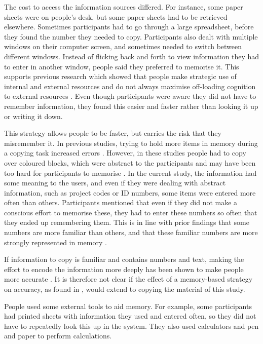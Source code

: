 The cost to access the information sources differed. For instance, some paper sheets were on people's desk, but some paper sheets had to be retrieved elsewhere. Sometimes participants had to go through a large spreadsheet, before they found the number they needed to copy. Participants also dealt with multiple windows on their computer screen, and sometimes needed to switch between different windows. Instead of flicking back and forth to view information they had to enter in another window, people said they preferred to memorise it. This supports previous research which showed that people make strategic use of internal and external resources and do not always maximise off-loading cognition to external resources \citep{Gray2006}. Even though participants were aware they did not have to remember information, they found this easier and faster rather than looking it up or writing it down. 

This strategy allows people to be faster, but carries the risk that they misremember it. In previous studies, trying to hold more items in memory during a copying task increased errors \citep[e.g.][]{Morgan2009}. However, in these studies people had to copy over coloured blocks, which were abstract to the participants and may have been too hard for participants to memorise \citep{Waldron2011}. In the current study, the information had some meaning to the users, and even if they were dealing with abstract information, such as project codes or ID numbers, some items were entered more often than others. Participants mentioned that even if they did not make a conscious effort to memorise these, they had to enter these numbers so often that they ended up remembering them. This is in line with prior findings that some numbers are more familiar than others, and that these familiar numbers are more strongly represented in memory \citep{Wiseman2014}. 

If information to copy is familiar and contains numbers and text, making the effort to encode the information more deeply has been shown to make people more accurate \citep{Gray2004, Soboczenski2013}. It is therefore not clear if the effect of a memory-based strategy on accuracy, as found in \citep{Morgan2009}, would extend to copying the material of this study.

People used some external tools to aid memory. For example, some participants had printed sheets with information they used and entered often, so they did not have to repeatedly look this up in the system. They also used calculators and pen and paper to perform calculations.

